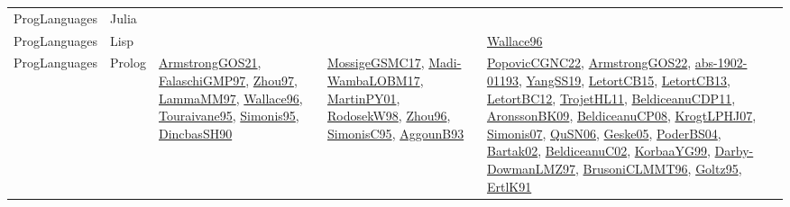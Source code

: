 {\begin{longtable}{lp{3cm}>{\raggedright}p{6cm}>{\raggedright}p{6cm}p{8cm}}
ProgLanguages & Julia &  &  & \\
ProgLanguages & Lisp &  &  & \href{articles/Wallace96.pdf}{Wallace96}\cite{Wallace96}\\
ProgLanguages & Prolog & \href{papers/ArmstrongGOS21.pdf}{ArmstrongGOS21}\cite{ArmstrongGOS21}, \href{articles/FalaschiGMP97.pdf}{FalaschiGMP97}\cite{FalaschiGMP97}, \href{articles/Zhou97.pdf}{Zhou97}\cite{Zhou97}, \href{articles/LammaMM97.pdf}{LammaMM97}\cite{LammaMM97}, \href{articles/Wallace96.pdf}{Wallace96}\cite{Wallace96}, \href{papers/Touraivane95.pdf}{Touraivane95}\cite{Touraivane95}, \href{papers/Simonis95.pdf}{Simonis95}\cite{Simonis95}, \href{articles/DincbasSH90.pdf}{DincbasSH90}\cite{DincbasSH90} & \href{papers/MossigeGSMC17.pdf}{MossigeGSMC17}\cite{MossigeGSMC17}, \href{papers/Madi-WambaLOBM17.pdf}{Madi-WambaLOBM17}\cite{Madi-WambaLOBM17}, \href{articles/MartinPY01.pdf}{MartinPY01}\cite{MartinPY01}, \href{papers/RodosekW98.pdf}{RodosekW98}\cite{RodosekW98}, \href{papers/Zhou96.pdf}{Zhou96}\cite{Zhou96}, \href{papers/SimonisC95.pdf}{SimonisC95}\cite{SimonisC95}, \href{articles/AggounB93.pdf}{AggounB93}\cite{AggounB93} & \href{papers/PopovicCGNC22.pdf}{PopovicCGNC22}\cite{PopovicCGNC22}, \href{papers/ArmstrongGOS22.pdf}{ArmstrongGOS22}\cite{ArmstrongGOS22}, \href{articles/abs-1902-01193.pdf}{abs-1902-01193}\cite{abs-1902-01193}, \href{papers/YangSS19.pdf}{YangSS19}\cite{YangSS19}, \href{articles/LetortCB15.pdf}{LetortCB15}\cite{LetortCB15}, \href{papers/LetortCB13.pdf}{LetortCB13}\cite{LetortCB13}, \href{papers/LetortBC12.pdf}{LetortBC12}\cite{LetortBC12}, \href{articles/TrojetHL11.pdf}{TrojetHL11}\cite{TrojetHL11}, \href{articles/BeldiceanuCDP11.pdf}{BeldiceanuCDP11}\cite{BeldiceanuCDP11}, \href{papers/AronssonBK09.pdf}{AronssonBK09}\cite{AronssonBK09}, \href{papers/BeldiceanuCP08.pdf}{BeldiceanuCP08}\cite{BeldiceanuCP08}, \href{papers/KrogtLPHJ07.pdf}{KrogtLPHJ07}\cite{KrogtLPHJ07}, \href{articles/Simonis07.pdf}{Simonis07}\cite{Simonis07}, \href{papers/QuSN06.pdf}{QuSN06}\cite{QuSN06}, \href{papers/Geske05.pdf}{Geske05}\cite{Geske05}, \href{articles/PoderBS04.pdf}{PoderBS04}\cite{PoderBS04}, \href{papers/Bartak02.pdf}{Bartak02}\cite{Bartak02}, \href{papers/BeldiceanuC02.pdf}{BeldiceanuC02}\cite{BeldiceanuC02}, \href{papers/KorbaaYG99.pdf}{KorbaaYG99}\cite{KorbaaYG99}, \href{articles/Darby-DowmanLMZ97.pdf}{Darby-DowmanLMZ97}\cite{Darby-DowmanLMZ97}, \href{papers/BrusoniCLMMT96.pdf}{BrusoniCLMMT96}\cite{BrusoniCLMMT96}, \href{papers/Goltz95.pdf}{Goltz95}\cite{Goltz95}, \href{papers/ErtlK91.pdf}{ErtlK91}\cite{ErtlK91}\\

\end{longtable}}
